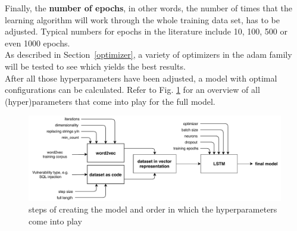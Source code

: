 \documentclass[
a4paper,
pagesize,
pdftex,
12pt,
ngerman,
fleqn,
final,
]{scrartcl}
\begin{document}
	Finally, the \textbf{number of epochs}, in other words, the number of times that the learning algorithm will work through the whole training data set, has to be adjusted. Typical numbers for epochs in the literature include 10, 100, 500 or even 1000 epochs.\\
	As described in Section~\ref{optimizer}, a variety of optimizers in the adam family will be tested to see which yields the best results.\\
	After all those hyperparameters have been adjusted, a model with optimal configurations can be calculated. Refer to Fig. \ref{fig:parameters} for an overview of all (hyper)parameters that come into play for the full model.
	
	\begin{figure}[h]
		\centering
		\includegraphics[width=\linewidth]{img/Parameters}
		\caption{steps of creating the model and order in which the hyperparameters come into play}
		\label{fig:parameters}
	\end{figure}
	
\end{document}
